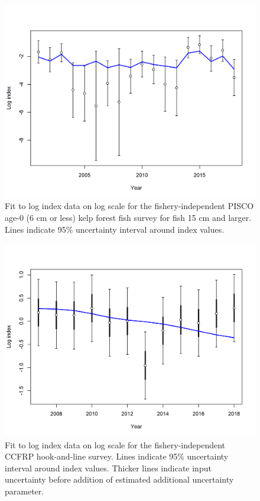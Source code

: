 \documentclass[12pt,]{article}
\begin{document}
\FloatBarrier 

\begin{figure}
\centering
\includegraphics{r4ss/plots_mod1/index5_logcpuefit_PISCOage0.png}
\caption{Fit to log index data on log scale for the fishery-independent
PISCO age-0 (6 cm or less) kelp forest fish survey for fish 15 cm and
larger. Lines indicate 95\% uncertainty interval around index values.
\label{fig:index5_logcpuefit_PISCOage0}}
\end{figure}

\FloatBarrier

\begin{figure}
\centering
\includegraphics{r4ss/plots_mod1/index5_logcpuefit_CCFRP.png}
\caption{Fit to log index data on log scale for the fishery-independent
CCFRP hook-and-line survey. Lines indicate 95\% uncertainty interval
around index values. Thicker lines indicate input uncertainty before
addition of estimated additional uncertainty parameter.
\label{fig:index5_logcpuefit_CCFRP}}
\end{figure}
\end{document}
